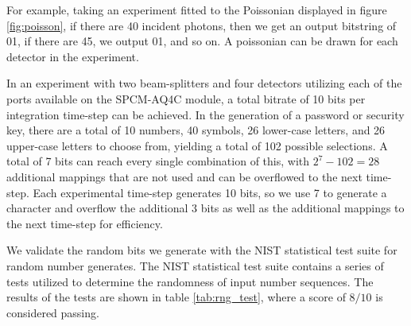 \documentclass[letterpaper, 11 pt]{book}
\begin{document}
For example, taking an experiment fitted to the Poissonian displayed in figure
\ref{fig:poisson}, if there are 40 incident photons, then we get an output
bitstring of 01, if there are 45, we output 01, and so on. A poissonian can be
drawn for each detector in the experiment.

In an experiment with two beam-splitters and four detectors utilizing each of
the ports available on the SPCM-AQ4C module, a total bitrate of 10 bits per
integration time-step can be achieved. In the generation of a password or
security key, there are a total of 10 numbers, 40 symbols, 26 lower-case
letters, and 26 upper-case letters to choose from, yielding a total of 102
possible selections. A total of 7 bits can reach every single combination of
this, with $2^7 - 102 = 28$ additional mappings that are not used and can be
overflowed to the next time-step. Each experimental time-step generates 10 bits,
so we use 7 to generate a character and overflow the additional 3 bits as well
as the additional mappings to the next time-step for efficiency. 

We validate the random bits we generate with the NIST statistical test suite for
random number generates. The NIST statistical test suite contains a series of
tests utilized to determine the randomness of input number sequences. The
results of the tests are shown in table \ref{tab:rng_test}, where a score of
$8/10$ is considered passing.%
\end{document}
